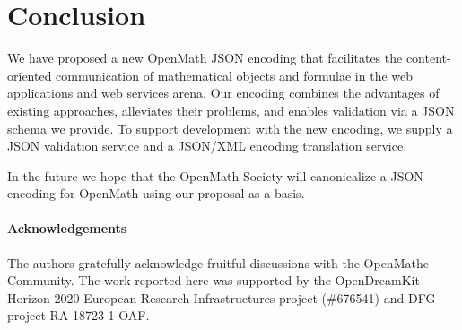 \section{Conclusion}\label{sec:concl}

We have proposed a new OpenMath JSON encoding that facilitates the content-oriented
communication of mathematical objects and formulae in the web applications and web
services arena. Our encoding combines the advantages of existing approaches, alleviates
their problems, and enables validation via a JSON schema we provide. To support
development with the new encoding, we supply a JSON validation service and a JSON/XML
encoding translation service.

In the future we hope that the OpenMath Society will canonicalize a JSON encoding for
OpenMath using our proposal as a basis. 

\paragraph*{Acknowledgements}
The authors gratefully acknowledge fruitful discussions with the OpenMathe Community. The
work reported here was supported by the OpenDreamKit Horizon 2020 European Research
Infrastructures project (\#676541) and DFG project RA-18723-1 OAF.


